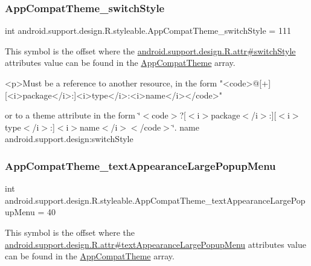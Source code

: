 \subsubsection{\texorpdfstring{App\+Compat\+Theme\+\_\+switch\+Style}{AppCompatTheme\_switchStyle}}
{\footnotesize\ttfamily int android.\+support.\+design.\+R.\+styleable.\+App\+Compat\+Theme\+\_\+switch\+Style = 111\hspace{0.3cm}{\ttfamily [static]}}

This symbol is the offset where the \hyperlink{classandroid_1_1support_1_1design_1_1R_1_1attr_a80507bb157d6c92971b9182db9cb6f3a}{android.\+support.\+design.\+R.\+attr\#switch\+Style} attribute\textquotesingle{}s value can be found in the \hyperlink{classandroid_1_1support_1_1design_1_1R_1_1styleable_afb351dc8de20cbd4c89abe360373010c}{App\+Compat\+Theme} array.

\begin{DoxyVerb}      <p>Must be a reference to another resource, in the form "<code>@[+][<i>package</i>:]<i>type</i>:<i>name</i></code>"
\end{DoxyVerb}
 or to a theme attribute in the form \char`\"{}$<$code$>$?\mbox{[}$<$i$>$package$<$/i$>$\+:\mbox{]}\mbox{[}$<$i$>$type$<$/i$>$\+:\mbox{]}$<$i$>$name$<$/i$>$$<$/code$>$\char`\"{}.  name android.\+support.\+design\+:switch\+Style \mbox{\label{classandroid_1_1support_1_1design_1_1R_1_1styleable_a9ce465853ff5c3303afda4d0d788d041}} 
\subsubsection{\texorpdfstring{App\+Compat\+Theme\+\_\+text\+Appearance\+Large\+Popup\+Menu}{AppCompatTheme\_textAppearanceLargePopupMenu}}
{\footnotesize\ttfamily int android.\+support.\+design.\+R.\+styleable.\+App\+Compat\+Theme\+\_\+text\+Appearance\+Large\+Popup\+Menu = 40\hspace{0.3cm}{\ttfamily [static]}}

This symbol is the offset where the \hyperlink{classandroid_1_1support_1_1design_1_1R_1_1attr_aa64eaeed4304e517cca3d5dba09f339e}{android.\+support.\+design.\+R.\+attr\#text\+Appearance\+Large\+Popup\+Menu} attribute\textquotesingle{}s value can be found in the \hyperlink{classandroid_1_1support_1_1design_1_1R_1_1styleable_afb351dc8de20cbd4c89abe360373010c}{App\+Compat\+Theme} array.

